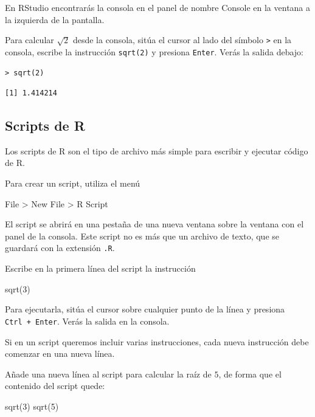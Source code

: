 \documentclass[
  degree=mecinf,
  title=normal,
  toc=normal,
  bib=normal]{mnye}
\newenvironment{menu}{
    \begin{center}
    \sffamily\bfseries
}{
    \end{center}
}
\newenvironment{Shaded}{\begin{snugshade}}{\end{snugshade}}
\newcommand{\NormalTok}[1]{#1}
\begin{document}
En \textsf{RStudio} encontrarás la consola en el panel de nombre \textsf{Console} en la ventana a la izquierda de la pantalla.

Para calcular \(\sqrt{2}\) desde la consola, sitúa el cursor al lado del símbolo \texttt{\textgreater{}} en la consola, escribe la instrucción \texttt{sqrt(2)} y presiona \texttt{Enter}. Verás la salida debajo:

\begin{verbatim}
> sqrt(2)
\end{verbatim}

\begin{verbatim}
[1] 1.414214
\end{verbatim}

\hypertarget{scripts-de-r}{%
\subsection{Scripts de R}\label{scripts-de-r}}

Los scripts de R son el tipo de archivo más simple para escribir y ejecutar código de \textsf{R}.

Para crear un script, utiliza el menú

\begin{menu}
File \textgreater{} New File \textgreater{} R Script

\end{menu}

El script se abrirá en una pestaña de una nueva ventana sobre la ventana con el panel de la consola. Este script no es más que un archivo de texto, que se guardará con la extensión \texttt{.R}.

Escribe en la primera línea del script la instrucción

\begin{Shaded}
\begin{Highlighting}[]
\NormalTok{sqrt(3)}
\end{Highlighting}
\end{Shaded}

Para ejecutarla, sitúa el cursor sobre cualquier punto de la línea y presiona \texttt{Ctrl\ +\ Enter}. Verás la salida en la consola.

Si en un script queremos incluir varias instrucciones, cada nueva instrucción debe comenzar en una nueva línea.

Añade una nueva línea al script para calcular la raíz de \(5\), de forma que el contenido del script quede:

\begin{Shaded}
\begin{Highlighting}[]
\NormalTok{sqrt(3)}
\NormalTok{sqrt(5)}
\end{Highlighting}
\end{Shaded}
\end{document}
